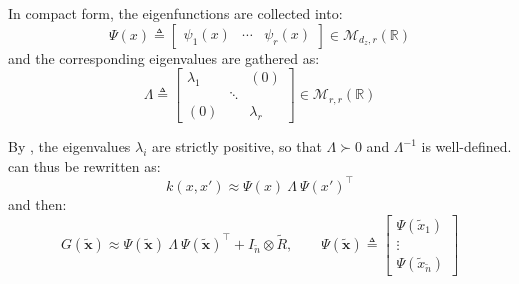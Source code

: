 In compact form, the eigenfunctions are collected into:
\begin{equation}
	\Psi(x)\triangleq\begin{bmatrix}
	\psi_1(x)&\cdots&\psi_r(x)
	\end{bmatrix}\in\mathcal{M}_{d_z,r}(\mathbb{R})
\end{equation}
and the corresponding eigenvalues are gathered as:
\begin{equation}
	\Lambda\triangleq\begin{bmatrix}
	\lambda_1&&(0)\\&\ddots&\\(0)&&\lambda_r
	\end{bmatrix}\in\mathcal{M}_{r,r}(\mathbb{R})
\end{equation}

By , the eigenvalues $\lambda_i$ are strictly positive, so that $\Lambda\succ0$ and $\Lambda^{-1}$ is well-defined.  can thus be rewritten as:
\begin{equation}
	k(x,x')\approx\Psi(x)\:\Lambda\:\Psi(x')^\top
\end{equation}
and then:
\begin{equation}
	G(\tilde{\mathbf{x}})\approx\Psi(\tilde{\mathbf{x}})\:\Lambda\:\Psi(\tilde{\mathbf{x}})^\top+I_{\tilde{n}}\otimes\tilde{R},
	\qquad\Psi(\tilde{\mathbf{x}})\triangleq\begin{bmatrix}\Psi(\tilde{x}_1)\\\vdots\\\Psi(\tilde{x}_{\tilde{n}})\end{bmatrix}\label{eq:reduced_rank_Gram}
\end{equation}

